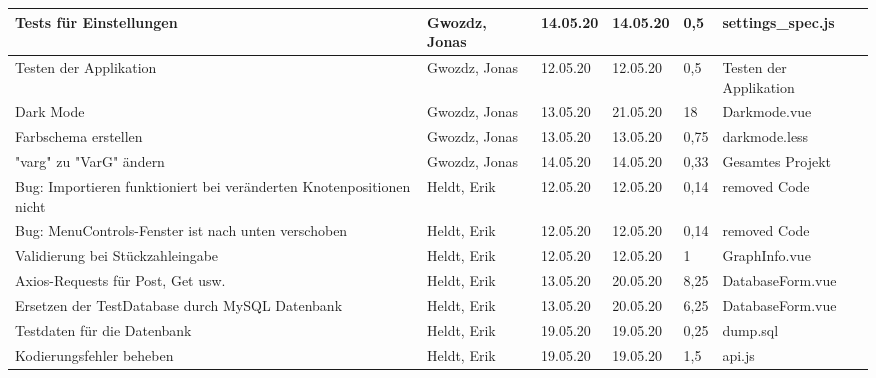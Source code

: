 \begin{longtable}{|p{4cm}|p{2cm}|p{1.2cm}|p{1.2cm}|p{0.7cm}|p{3.8cm}|}
  Tests für Einstellungen                                               & Gwozdz, Jonas         & 14.05.20 & 14.05.20 & 0,5   & settings\_spec.js                                            \\ \hline
  Testen der Applikation                                                & Gwozdz, Jonas         & 12.05.20 & 12.05.20 & 0,5   & Testen der Applikation                                      \\ \hline
  Dark Mode                                                             & Gwozdz, Jonas         & 13.05.20 & 21.05.20 & 18    & Darkmode.vue                                                \\ \hline
  Farbschema erstellen                                                  & Gwozdz, Jonas         & 13.05.20 & 13.05.20 & 0,75  & darkmode.less                                               \\ \hline
  "varg" zu "VarG" ändern                                               & Gwozdz, Jonas         & 14.05.20 & 14.05.20 & 0,33  & Gesamtes Projekt                                            \\ \hline
  
  Bug: Importieren funktioniert bei veränderten Knotenpositionen nicht  & Heldt, Erik           & 12.05.20 & 12.05.20 & 0,14  & removed Code                                                \\ \hline
  Bug: MenuControls-Fenster ist nach unten verschoben                   & Heldt, Erik           & 12.05.20 & 12.05.20 & 0,14  & removed Code                                                \\ \hline
  Validierung bei Stückzahleingabe                                      & Heldt, Erik           & 12.05.20 & 12.05.20 & 1     & GraphInfo.vue                                               \\ \hline
  Axios-Requests für Post, Get usw.                                     & Heldt, Erik           & 13.05.20 & 20.05.20 & 8,25  & DatabaseForm.vue                                            \\ \hline
  Ersetzen der TestDatabase durch MySQL Datenbank                       & Heldt, Erik           & 13.05.20 & 20.05.20 & 6,25  & DatabaseForm.vue                                            \\ \hline
  Testdaten für die Datenbank                                           & Heldt, Erik           & 19.05.20 & 19.05.20 & 0,25  & dump.sql                                                    \\ \hline
  Kodierungsfehler beheben                                              & Heldt, Erik           & 19.05.20 & 19.05.20 & 1,5   & api.js                                                      \\ \hline


\end{longtable}
